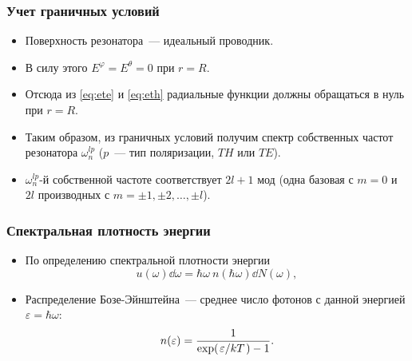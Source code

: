 \documentclass[compress]{beamer}
\begin{document}
    \begin{frame}\frametitle{Учет граничных условий}

        \begin{itemize}\justifying
            \item Поверхность резонатора~--- идеальный проводник.

            \item В силу этого $E^\varphi = E^\theta = 0$ при $r = R$.

            \item Отсюда из \autoref{eq:ete} и \autoref{eq:eth} радиальные функции должны обращаться в нуль при $r = R$.

            \item Таким образом, из граничных условий получим спектр собственных частот резонатора $\omega^{lp}_n$ ($p$~--- тип поляризации, $TH$ или $TE$).

            \item $\omega^{lp}_n$-й собственной частоте соответствует $2l + 1$ мод (одна базовая с $m = 0$ и $2l$ производных с $m = \pm 1, \pm 2, \dots, \pm l$).
        \end{itemize}

    \end{frame}


    \begin{frame}\frametitle{Спектральная плотность энергии}

        \begin{itemize}\justifying

            \item По определению спектральной плотности энергии
            \begin{equation}\label{eq:psd}
                u(\omega) \dd{\omega} = \hbar\omega\ n(\hbar\omega) \dd{N(\omega)} ,
            \end{equation}

            \item Распределение Бозе-Эйнштейна~--- среднее число фотонов с данной энергией $\varepsilon = \hbar\omega$:
            \begin{equation}\label{eq:n_of_eps}
                n(\varepsilon) = \frac{1}{\exp(\flatfrac{\varepsilon}{kT}) - 1} .
            \end{equation}

        \end{itemize}

    \end{frame}
\end{document}

